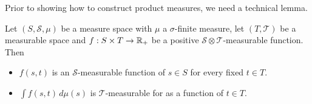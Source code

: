 Prior to showing how to construct product measures, we need a
technical lemma.
\begin{lem}\label{MeasurableSections}Let $(S, \mathcal{S}, \mu)$ be a measure space with $\mu$ a
  $\sigma$-finite measure, let $(T, \mathcal{T})$ be a measurable
  space and $f : S \times T \to \mathbb{R}_+$ be a positive $\mathcal{S} \otimes \mathcal{T} $-measurable
  function.  Then
\begin{itemize}
\item[(i)]$f(s,t)$ is an $\mathcal{S}$-measurable function of $s \in
  S$ for every fixed $t \in T$.
\item[(ii)] $\int f(s,t) \,  d \mu(s)$ is $\mathcal{T}$-measurable for
  as a function of $t \in T$.
\end{itemize}
\end{lem}
